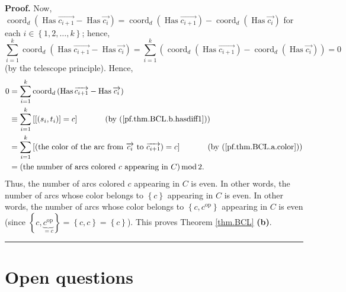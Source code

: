 \documentclass[numbers=enddot,12pt,final,onecolumn,notitlepage,abstracton]{scrartcl}%
\theoremstyle{definition}
\newenvironment{proof}[1][Proof]{\noindent\textbf{#1.} }{\ \rule{0.5em}{0.5em}}
\let\sumnonlimits\sum
\renewcommand{\sum}{\sumnonlimits\limits}
\begin{document}
\begin{proof}
Now, $\operatorname*{coord}\nolimits_{d}\left(  \operatorname*{Has}%
\overrightarrow{c_{i+1}}-\operatorname*{Has}\overrightarrow{c_{i}}\right)
=\operatorname*{coord}\nolimits_{d}\left(  \operatorname*{Has}%
\overrightarrow{c_{i+1}}\right)  -\operatorname*{coord}\nolimits_{d}\left(
\operatorname*{Has}\overrightarrow{c_{i}}\right)  $ for each $i\in\left\{
1,2,\ldots,k\right\}  $; hence,%
\[
\sum_{i=1}^{k}\operatorname*{coord}\nolimits_{d}\left(  \operatorname*{Has}%
\overrightarrow{c_{i+1}}-\operatorname*{Has}\overrightarrow{c_{i}}\right)
=\sum_{i=1}^{k}\left(  \operatorname*{coord}\nolimits_{d}\left(
\operatorname*{Has}\overrightarrow{c_{i+1}}\right)  -\operatorname*{coord}%
\nolimits_{d}\left(  \operatorname*{Has}\overrightarrow{c_{i}}\right)
\right)  =0
\]
(by the telescope principle). Hence,%
\begin{align*}
0  &  =\sum_{i=1}^{k}\operatorname*{coord}\nolimits_{d}\left(
\operatorname*{Has}\overrightarrow{c_{i+1}}-\operatorname*{Has}%
\overrightarrow{c_{i}}\right) \\
&  \equiv\sum_{i=1}^{k}\left[  \left[  \left(  s_{i},t_{i}\right)  \right]
=c\right]  \ \ \ \ \ \ \ \ \ \ \left(  \text{by (\ref{pf.thm.BCL.b.hasdiff1}%
)}\right) \\
&  =\sum_{i=1}^{k}\left[  \left(  \text{the color of the arc from
}\overrightarrow{c_{i}}\text{ to }\overrightarrow{c_{i+1}}\right)  =c\right]
\ \ \ \ \ \ \ \ \ \ \left(  \text{by (\ref{pf.thm.BCL.a.color})}\right) \\
&  =\left(  \text{the number of arcs colored }c\text{ appearing in }C\right)
\operatorname{mod}2.
\end{align*}
Thus, the number of arcs colored $c$ appearing in $C$ is even. In other words,
the number of arcs whose color belongs to $\left\{  c\right\}  $ appearing in
$C$ is even. In other words, the number of arcs whose color belongs to
$\left\{  c,c^{\operatorname*{op}}\right\}  $ appearing in $C$ is even (since
$\left\{  c,\underbrace{c^{\operatorname*{op}}}_{=c}\right\}  =\left\{
c,c\right\}  =\left\{  c\right\}  $). This proves Theorem \ref{thm.BCL}
\textbf{(b)}.
\end{proof}


\section{Open questions}
\end{document}
